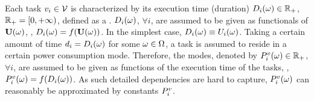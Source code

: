 Each task $v_i \in \mathcal{V}$ is characterized by its execution time (duration) $D_i(\omega) \in \mathbb{R}_+$, $\mathbb{R}_+ = [0, +\infty)$, defined as a \rv. $D_i(\omega)$, $\forall i$, are assumed to be given as functionals of $\mathbf{U}(\omega)$, \ie, $D_i(\omega) = f(\mathbf{U}(\omega))$. In the simplest case, $D_i(\omega) \equiv U_i(\omega)$. Taking a certain amount of time $d_i = D_i(\omega)$ for some $\omega \in \Omega$, a task is assumed to reside in a certain power consumption mode. Therefore, the modes, denoted by $P^v_i(\omega) \in \mathbb{R}_+$, $\forall i$, are assumed to be given as functions of the execution time of the tasks, \ie, $P^v_i(\omega) = f(D_i(\omega))$. As such detailed dependencies are hard to capture, $P^v_i(\omega)$ can reasonably be approximated by constants $P^v_i$.
